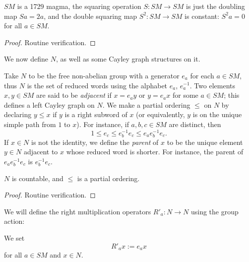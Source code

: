 \begin{lemma}\label{sm-1729}\leanok $SM$ is a 1729 magma, the squaring operation $S: SM \to SM$ is just the doubling map $Sa = 2a$, and the double squaring map $S^2: SM \to SM$ is constant: $S^2 a = 0$ for all $a \in SM$.
\end{lemma}

\begin{proof}\leanok Routine verification.
\end{proof}

We now define $N$, as well as some Cayley graph structures on it.

\begin{definition}[Definition of $N$]\label{n-def} Take $N$ to be the free non-abelian group with a generator $e_a$ for each $a \in SM$, thus $N$ is the set of reduced words using the alphabet $e_a$, $e_a^{-1}$.  Two elements $x,y \in SM$ are said to be \emph{adjacent} if $x = e_a y$ or $y = e_a x$ for some $a \in SM$; this defines a left Cayley graph on $N$.  We make a partial ordering $\leq$ on $N$ by declaring $y \leq x$ if $y$ is a right subword of $x$ (or equivalently, $y$ is on the unique simple path from $1$ to $x$).  For instance, if $a,b,c \in SM$ are distinct, then
  $$ 1 \leq e_c \leq e_b^{-1} e_c \leq e_a e_b^{-1} e_c.$$
If $x \in N$ is not the identity, we define the \emph{parent} of $x$ to be the unique element $y \in N$ adjacent to $x$ whose reduced word is shorter.  For instance, the parent of $e_a e_b^{-1} e_c$ is $e_b^{-1} e_c$.
\end{definition}

\begin{lemma}\label{n-prop}  $N$ is countable, and $\leq$ is a partial ordering.
\end{lemma}

\begin{proof} Routine verification.
\end{proof}

We will define the right multiplication operators $R'_a: N \to N$ using the group action:

\begin{definition}[Definition of $R'_a$]\label{ra-defn}\leanok We set
  \begin{equation}\label{ra-def}
    R'_a x := e_a x
  \end{equation}
  for all $a \in SM$ and $x \in N$.
\end{definition}

